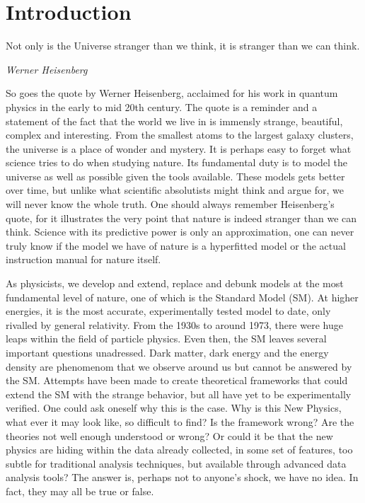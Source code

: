\chapter*{Introduction}

\epigraph{Not only is the Universe stranger than we think, it is stranger than we can think.}{\textit{Werner Heisenberg}}
So goes the quote by Werner Heisenberg, acclaimed for his work in quantum physics in the early to mid 
20th century. The quote is a reminder and a statement of the fact that the world we live in is immensly 
strange, beautiful, complex and interesting. From the smallest atoms to the largest galaxy clusters, 
the universe is a place of wonder and mystery. It is perhaps easy to forget what science tries to do
when studying nature. Its fundamental duty is to model the universe as well as possible given the tools 
available. These models gets better over time, but unlike what scientific absolutists might think and 
argue for, we will never know the whole truth. One should always remember Heisenberg's quote, for it
illustrates the very point that nature is indeed stranger than we can think. Science with its 
predictive power is only an approximation, one can never truly know if the model we have of nature is 
a hyperfitted model or the actual instruction manual for nature itself. \par 
As physicists, we develop 
and extend, replace and debunk models at the most fundamental level of nature, one of which is
the Standard Model (SM). At higher energies, it is the most accurate, experimentally tested model to date,
only rivalled by general relativity. From the 1930s to around 1973, there were huge leaps within the field
of particle physics. Even then, the SM leaves several important questions unadressed. Dark matter, dark energy
and the energy density are phenomenom that we observe around us but cannot be answered by the SM. 
Attempts have been made to create theoretical frameworks that could extend the SM with the strange behavior, 
but all have yet to be experimentally verified. One could ask oneself why 
this is the case. Why is this New Physics, what ever it may look like, so difficult to find? 
Is the framework wrong? Are the theories not well enough understood or wrong? Or could it be that
the new physics are hiding within the data already collected, in some set of features, too subtle for
traditional analysis techniques, but available through advanced data analysis tools? The answer is, perhaps not to 
anyone's shock, we have no idea. In fact, they may all be true or false.\par 
